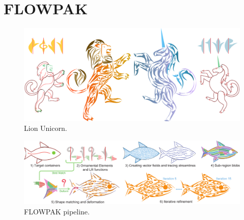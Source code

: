 
\chapter{FLOWPAK}

\begin{figure}
\centering
\includegraphics[width=1.0\textwidth]{figures/flowpak/lion_unicorn.pdf} 
\caption{\label{fig_lion_unicorn} 
Lion Unicorn. }
\end{figure}

\begin{figure}
\centering
\includegraphics[width=1.0\textwidth]{figures/flowpak/pipeline.pdf} 
\caption{\label{fig_flowpak_pipeline} 
FLOWPAK pipeline. }
\end{figure}